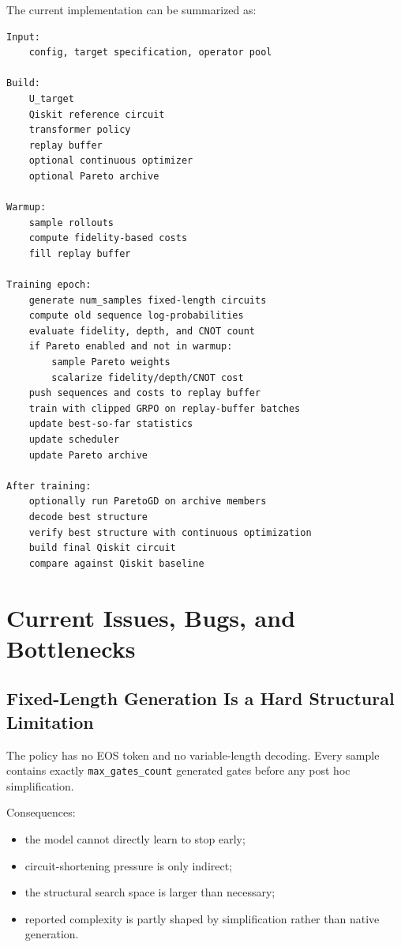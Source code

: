 \documentclass[11pt]{article}
\begin{document}
The current implementation can be summarized as:

\begin{verbatim}
Input:
    config, target specification, operator pool

Build:
    U_target
    Qiskit reference circuit
    transformer policy
    replay buffer
    optional continuous optimizer
    optional Pareto archive

Warmup:
    sample rollouts
    compute fidelity-based costs
    fill replay buffer

Training epoch:
    generate num_samples fixed-length circuits
    compute old sequence log-probabilities
    evaluate fidelity, depth, and CNOT count
    if Pareto enabled and not in warmup:
        sample Pareto weights
        scalarize fidelity/depth/CNOT cost
    push sequences and costs to replay buffer
    train with clipped GRPO on replay-buffer batches
    update best-so-far statistics
    update scheduler
    update Pareto archive

After training:
    optionally run ParetoGD on archive members
    decode best structure
    verify best structure with continuous optimization
    build final Qiskit circuit
    compare against Qiskit baseline
\end{verbatim}

\section{Current Issues, Bugs, and Bottlenecks}

\subsection{Fixed-Length Generation Is a Hard Structural Limitation}

The policy has no EOS token and no variable-length decoding. Every sample contains exactly \texttt{max\_gates\_count} generated gates before any post hoc simplification.

Consequences:

\begin{itemize}[leftmargin=*]
\item the model cannot directly learn to stop early;
\item circuit-shortening pressure is only indirect;
\item the structural search space is larger than necessary;
\item reported complexity is partly shaped by simplification rather than native generation.
\end{itemize}
\end{document}
